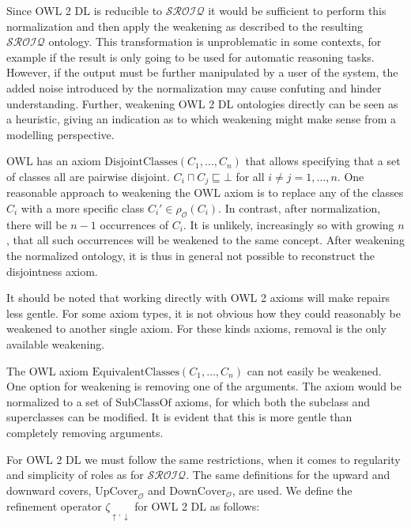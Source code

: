 Since OWL 2 DL is reducible to $\mathcal{SROIQ}$ it would be sufficient to perform this normalization and then apply the weakening as described to the resulting $\mathcal{SROIQ}$ ontology. This transformation is unproblematic in some contexts, for example if the result is only going to be used for automatic reasoning tasks. However, if the output must be further manipulated by a user of the system, the added noise introduced by the normalization may cause confuting and hinder understanding. Further, weakening OWL 2 DL ontologies directly can be seen as a heuristic, giving an indication as to which weakening might make sense from a modelling perspective.

\begin{example}
OWL has an axiom $\mathrm{DisjointClasses}(C_1, \dots, C_n)$ that allows specifying that a set of classes all are pairwise disjoint. $C_i \sqcap C_j \sqsubseteq \bot$ for all $i \not= j = 1, \dots, n$. One reasonable approach to weakening the OWL axiom is to replace any of the classes $C_i$ with a more specific class $C_i' \in \rho_\mathcal{O}(C_i)$. In contrast, after normalization, there will be $n - 1$ occurrences of $C_i$. It is unlikely, increasingly so with growing $n$, that all such occurrences will be weakened to the same concept. After weakening the normalized ontology, it is thus in general not possible to reconstruct the disjointness axiom.
\end{example}

It should be noted that working directly with OWL 2 axioms will make repairs less gentle. For some axiom types, it is not obvious how they could reasonably be weakened to another single axiom. For these kinds axioms, removal is the only available weakening.

\begin{example}
The OWL axiom $\mathrm{EquivalentClasses}(C_1, \dots, C_n)$ can not easily be weakened. One option for weakening is removing one of the arguments. The axiom would be normalized to a set of $\mathrm{SubClassOf}$ axioms, for which both the subclass and superclasses can be modified. It is evident that this is more gentle than completely removing arguments.
\end{example}

For OWL 2 DL we must follow the same restrictions, when it comes to regularity and simplicity of roles as for $\mathcal{SROIQ}$. The same definitions for the upward and downward covers, $\mathrm{UpCover}_\mathcal{O}$ and $\mathrm{DownCover}_\mathcal{O}$, are used. We define the refinement operator $\zeta_{\uparrow,\downarrow}$ for OWL 2 DL as follows:

